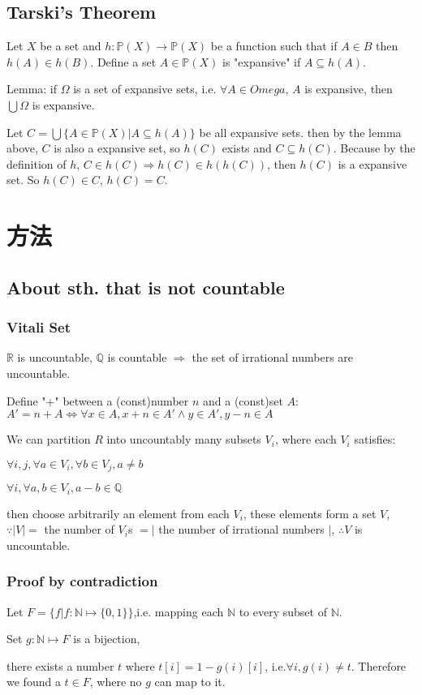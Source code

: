 \documentclass[12pt,a4paper]{ctexrep}
\begin{document}
\subsection{Tarski's Theorem}
Let $X$ be a set and $h: \mathbb{P}(X) \rightarrow \mathbb{P}(X)$ be a function such that if $A \in B$ then $h(A) \in h(B)$. Define a set $A \in \mathbb{P}(X)$ is "expansive" if $A \subseteq h(A)$.

Lemma: if $\Omega$ is a set of expansive sets, i.e. $\forall A \in Omega$, $A$ is expansive, then $\bigcup \Omega$ is expansive.

Let $C = \bigcup\{A\in \mathbb{P}(X)| A \subseteq h(A)\}$ be all expansive sets. then by the lemma above, $C$ is also a expansive set, so $h(C)$ exists and $C \subseteq h(C)$. Because by the definition of $h$, $C \in h(C) \Rightarrow h(C) \in h(h(C))$, then $h(C)$ is a expansive set. So $h(C) \in C$, $h(C) = C$.
\section{方法}
\subsection{About sth. that is not countable}
\subsubsection{Vitali Set}
$\mathbb{R}$ is uncountable, $\mathbb{Q}$ is countable $\Rightarrow$ the set of irrational numbers are uncountable.

Define "+" between a (const)number $n$ and a (const)set $A$: $A' = n+A \iff \forall x\in A, x+n \in A' \wedge y \in A', y-n \in A$

We can partition $R$ into uncountably many subsets $V_i$, where each $V_i$ satisfies:

$\forall i,j, \forall a\in V_i, \forall b \in V_j, a \neq b$

$\forall i, \forall a,b \in V_i, a-b \in \mathbb{Q}$

then choose arbitrarily an element from each $V_i$, these elements form a set $V$, $\because |V| = $ the number of $V_i$s $= |$ the number of irrational numbers $|$, $\therefore V $ is uncountable.

\subsubsection{Proof by contradiction}
Let $F = \{f|f:\mathbb{N}\mapsto\{0,1\}\}$,i.e. mapping each $\mathbb{N}$ to every subset of $\mathbb{N}$.

Set $g:\mathbb{N}\mapsto F$ is a bijection, 

there exists a number $t$ where $t[i] = 1-g(i)[i]$, i.e.$\forall i, g(i) \neq t$. Therefore we found a $t \in F$, where no $g$ can map to it. 

\ifdebug
\end{document}
